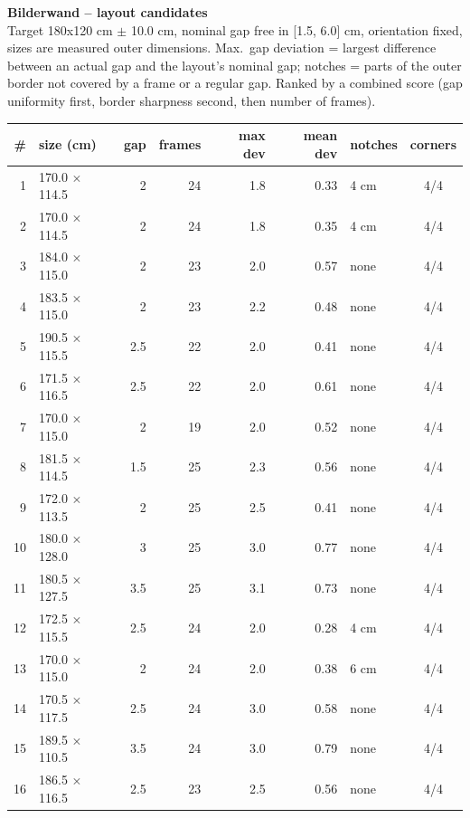 \documentclass[a4paper,landscape,10pt]{article}
\begin{document}
{\LARGE\bfseries Bilderwand -- layout candidates}\\[4pt]
{\small Target 180x120 cm $\pm$ 10.0 cm, nominal gap free in
[1.5, 6.0] cm, orientation fixed, sizes are measured outer dimensions.
Max.\ gap deviation = largest difference between an actual gap and the layout's nominal gap;
notches = parts of the outer border not covered by a frame or a regular gap. Ranked by a combined
score (gap uniformity first, border sharpness second, then number of frames).}\\[10pt]
\begin{minipage}[t]{0.6\textwidth}\vspace{0pt}
\begin{tabular}{@{}r l r r r r l c@{}}
\toprule
\# & size (cm) & gap & frames & max dev & mean dev & notches & corners \\
\midrule
1 & 170.0 $\times$ 114.5 & 2 & 24 & 1.8 & 0.33 & 4 cm & 4/4 \\
2 & 170.0 $\times$ 114.5 & 2 & 24 & 1.8 & 0.35 & 4 cm & 4/4 \\
3 & 184.0 $\times$ 115.0 & 2 & 23 & 2.0 & 0.57 & none & 4/4 \\
4 & 183.5 $\times$ 115.0 & 2 & 23 & 2.2 & 0.48 & none & 4/4 \\
5 & 190.5 $\times$ 115.5 & 2.5 & 22 & 2.0 & 0.41 & none & 4/4 \\
6 & 171.5 $\times$ 116.5 & 2.5 & 22 & 2.0 & 0.61 & none & 4/4 \\
7 & 170.0 $\times$ 115.0 & 2 & 19 & 2.0 & 0.52 & none & 4/4 \\
8 & 181.5 $\times$ 114.5 & 1.5 & 25 & 2.3 & 0.56 & none & 4/4 \\
9 & 172.0 $\times$ 113.5 & 2 & 25 & 2.5 & 0.41 & none & 4/4 \\
10 & 180.0 $\times$ 128.0 & 3 & 25 & 3.0 & 0.77 & none & 4/4 \\
11 & 180.5 $\times$ 127.5 & 3.5 & 25 & 3.1 & 0.73 & none & 4/4 \\
12 & 172.5 $\times$ 115.5 & 2.5 & 24 & 2.0 & 0.28 & 4 cm & 4/4 \\
13 & 170.0 $\times$ 115.0 & 2 & 24 & 2.0 & 0.38 & 6 cm & 4/4 \\
14 & 170.5 $\times$ 117.5 & 2.5 & 24 & 3.0 & 0.58 & none & 4/4 \\
15 & 189.5 $\times$ 110.5 & 3.5 & 24 & 3.0 & 0.79 & none & 4/4 \\
16 & 186.5 $\times$ 116.5 & 2.5 & 23 & 2.5 & 0.56 & none & 4/4 \\
\bottomrule
\end{tabular}
\end{minipage}\hfill
\end{document}
